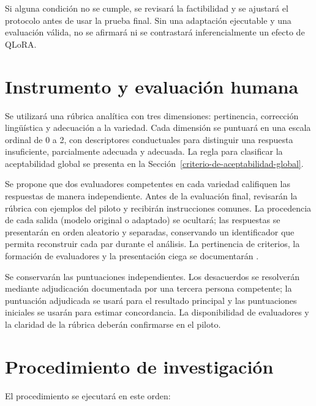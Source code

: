 Si alguna condición no se cumple, se revisará la factibilidad y se ajustará el protocolo antes de usar la prueba final. Sin una adaptación ejecutable y una evaluación válida, no se afirmará ni se contrastará inferencialmente un efecto de QLoRA.

\section{Instrumento y evaluación humana}\label{instrumento-y-evaluaciuxf3n-humana}

Se utilizará una rúbrica analítica con tres dimensiones: pertinencia, corrección lingüística y adecuación a la variedad. Cada dimensión se puntuará en una escala ordinal de 0 a 2, con descriptores conductuales para distinguir una respuesta insuficiente, parcialmente adecuada y adecuada. La regla para clasificar la aceptabilidad global se presenta en la Sección~\ref{criterio-de-aceptabilidad-global}.

Se propone que dos evaluadores competentes en cada variedad califiquen las respuestas de manera independiente. Antes de la evaluación final, revisarán la rúbrica con ejemplos del piloto y recibirán instrucciones comunes. La procedencia de cada salida (modelo original o adaptado) se ocultará; las respuestas se presentarán en orden aleatorio y separadas, conservando un identificador que permita reconstruir cada par durante el análisis. La pertinencia de criterios, la formación de evaluadores y la presentación ciega se documentarán \parencite{VanDerLee2019,Amidei2019}.

Se conservarán las puntuaciones independientes. Los desacuerdos se resolverán mediante adjudicación documentada por una tercera persona competente; la puntuación adjudicada se usará para el resultado principal y las puntuaciones iniciales se usarán para estimar concordancia. La disponibilidad de evaluadores y la claridad de la rúbrica deberán confirmarse en el piloto.

\section{Procedimiento de investigación}\label{procedimiento-de-investigaciuxf3n}

El procedimiento se ejecutará en este orden:


